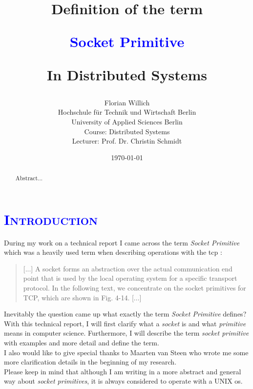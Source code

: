 \documentclass[xcolor=dvipsnames]{article}
\title{\scshape{
\begin{small}
Definition of the term\\
\end{small} 
\textbf{\textcolor{blue}{Socket Primitive}}\\
\begin{small}
In Distributed Systems
\end{small}
}}
\author{Florian Willich \\ Hochschule f\"ur Technik und Wirtschaft Berlin \\ University of Applied Sciences Berlin \\ Course: Distributed Systems \\ Lecturer: Prof. Dr. Christin Schmidt}
\date{\today}
\begin{document}

\begin{titlepage}

\maketitle

\begin{abstract}
Abstract...
\end{abstract}

\end{titlepage}

\newpage

\tableofcontents

\newpage


\section{\scshape{\textcolor{blue}{Introduction}}} \label{introduction}

During my work on a technical report I came across the term \textit{Socket Primitive} which was a heavily used term when describing operations with the \gls{tcp} \cite[p. 141, ch. 4.3.1]{tanenbaum}:

\begin{quote}
[...] A socket forms an abstraction over the actual communication end
point that is used by the local operating system for a specific
transport protocol. In the following text, we concentrate on the socket
primitives for TCP, which are shown in Fig. 4-14. [...] 
\end{quote}

\noindent Inevitably the question came up what exactly the term \textit{Socket Primitive} defines? With this technical report, I will first clarify what a \textit{socket} is and what \textit{primitive} means in computer science. Furthermore, I will describe the term \textit{socket primitive} with examples and more detail and define the term.\\

\noindent I also would like to give special thanks to Maarten van Steen who wrote me some more clarification details in the beginning of my research.\\

\noindent Please keep in mind that although I am writing in a more abstract and general way about \textit{socket primitives}, it is always considered to operate with a UNIX \gls{os}.
\end{document}
